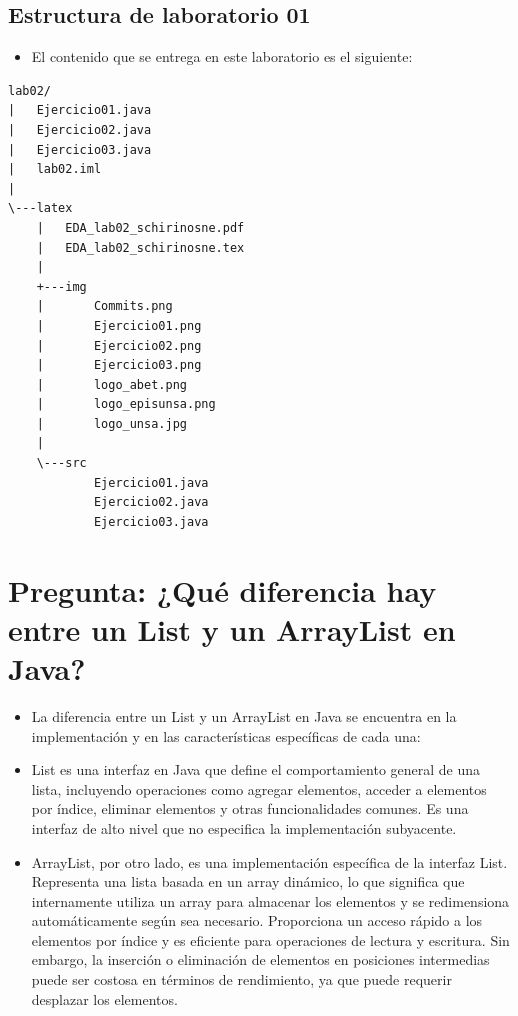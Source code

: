 \documentclass{article}
\begin{document}
	
		
	\subsection{Estructura de laboratorio 01}
	\begin{itemize}	
		\item El contenido que se entrega en este laboratorio es el siguiente:
	\end{itemize}
	
\begin{lstlisting}[style=ascii-tree]
lab02/
|   Ejercicio01.java
|   Ejercicio02.java
|   Ejercicio03.java
|   lab02.iml
|
\---latex
    |   EDA_lab02_schirinosne.pdf
    |   EDA_lab02_schirinosne.tex
    |
    +---img
    |       Commits.png
    |       Ejercicio01.png
    |       Ejercicio02.png
    |       Ejercicio03.png
    |       logo_abet.png
    |       logo_episunsa.png
    |       logo_unsa.jpg
    |
    \---src
            Ejercicio01.java
            Ejercicio02.java
            Ejercicio03.java
\end{lstlisting}    

\section{Pregunta: ¿Qué diferencia hay entre un List y un ArrayList en Java?
}
	\begin{itemize}
		\item La diferencia entre un List y un ArrayList en Java se encuentra en la implementación y en las características específicas de cada una:
		\item List es una interfaz en Java que define el comportamiento general de una lista, incluyendo operaciones como agregar elementos, acceder a elementos por índice, eliminar elementos y otras funcionalidades comunes. Es una interfaz de alto nivel que no especifica la implementación subyacente.
		\item ArrayList, por otro lado, es una implementación específica de la interfaz List. Representa una lista basada en un array dinámico, lo que significa que internamente utiliza un array para almacenar los elementos y se redimensiona automáticamente según sea necesario. Proporciona un acceso rápido a los elementos por índice y es eficiente para operaciones de lectura y escritura. Sin embargo, la inserción o eliminación de elementos en posiciones intermedias puede ser costosa en términos de rendimiento, ya que puede requerir desplazar los elementos.
		
	\end{itemize}	
\end{document}
